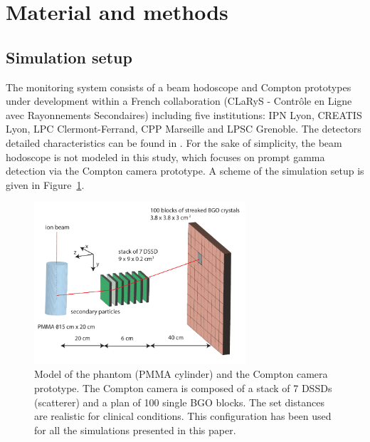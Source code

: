 
\section{Material and methods}

\subsection{Simulation setup}

The monitoring system consists of a beam hodoscope and Compton prototypes under development within a French collaboration (CLaRyS - Contr\^ole en Ligne avec Rayonnements Secondaires) including five institutions: IPN Lyon, CREATIS Lyon, LPC Clermont-Ferrand, CPP Marseille and LPSC Grenoble. The detectors detailed characteristics can be found in \cite{krimmer_development_2015}. For the sake of simplicity, the beam hodoscope is not modeled in this study, which focuses on prompt gamma detection via the Compton camera prototype. A scheme of the simulation setup is given in Figure~\ref{fig:fig_setup_CC_simulation_Hadronth}.

\begin{figure} [!hbtp]	
  \centering
  \includegraphics[width=0.7\textwidth]{./Figure/Compton_Camera_hadontherapy_PMMA_Cylinder_EN.pdf}
  \caption{Model of the phantom (PMMA cylinder) and the Compton camera prototype. The Compton camera is composed of a stack of 7 DSSDs (scatterer) and a plan of 100 single BGO blocks. The set distances are realistic for clinical conditions. This configuration has been used for all the simulations presented in this paper.}
  \label{fig:fig_setup_CC_simulation_Hadronth}
\end{figure}

